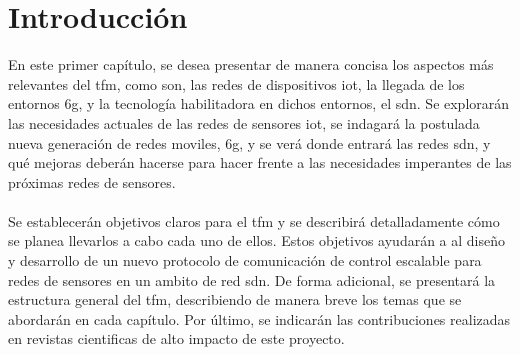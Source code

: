 
\chapter{Introducción}
\label{ch:intro}

\par
En este primer capítulo, se desea presentar de manera concisa los aspectos más relevantes del \gls{tfm}, como son, las redes de dispositivos \gls{iot}, la llegada de los entornos \gls{6g}, y la tecnología habilitadora en dichos entornos, el \gls{sdn}. Se explorarán las necesidades actuales de las redes de sensores \gls{iot}, se indagará la postulada nueva generación de redes moviles, \gls{6g}, y se verá donde entrará las redes \gls{sdn}, y qué mejoras deberán hacerse para hacer frente a las necesidades imperantes de las próximas redes de sensores.\\
\\
Se establecerán objetivos claros para el \gls{tfm} y se describirá detalladamente cómo se planea llevarlos a cabo cada uno de ellos. Estos objetivos ayudarán a al diseño y desarrollo de un nuevo protocolo de comunicación de control escalable para redes de sensores en un ambito de red \gls{sdn}. De forma adicional, se presentará la estructura general del \gls{tfm}, describiendo de manera breve los temas que se abordarán en cada capítulo. Por último, se indicarán las contribuciones realizadas en revistas cientificas de alto impacto de este proyecto.

